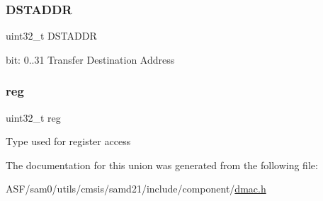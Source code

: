 \subsubsection{\texorpdfstring{DSTADDR}{DSTADDR}}
{\footnotesize\ttfamily uint32\+\_\+t D\+S\+T\+A\+D\+DR}

bit\+: 0..31 Transfer Destination Address \mbox{\label{union_d_m_a_c___d_s_t_a_d_d_r___type_a6b91636401516a477989a336376d7b40}} 
\subsubsection{\texorpdfstring{reg}{reg}}
{\footnotesize\ttfamily uint32\+\_\+t reg}

Type used for register access 

The documentation for this union was generated from the following file\+:\begin{DoxyCompactItemize}
\item 
A\+S\+F/sam0/utils/cmsis/samd21/include/component/\mbox{\hyperlink{component_2dmac_8h}{dmac.\+h}}\end{DoxyCompactItemize}
